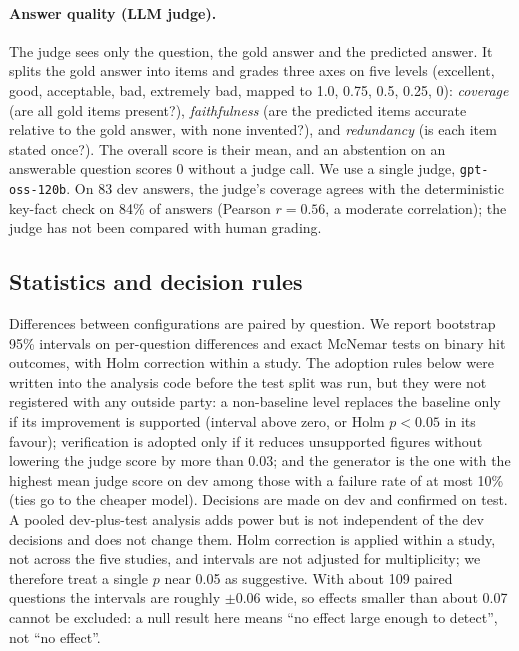 \documentclass[11pt,a4paper]{article}
\begin{document}
\paragraph{Answer quality (LLM judge).}\label{sec:judge} The judge sees only the question, the gold answer and the predicted answer. It splits the gold answer into items and grades three axes on five levels (excellent, good, acceptable, bad, extremely bad, mapped to 1.0, 0.75, 0.5, 0.25, 0): \emph{coverage} (are all gold items present?), \emph{faithfulness} (are the predicted items accurate relative to the gold answer, with none invented?), and \emph{redundancy} (is each item stated once?). The overall score is their mean, and an abstention on an answerable question scores 0 without a judge call. We use a single judge, \texttt{gpt-oss-120b}. On 83 dev answers, the judge's coverage agrees with the deterministic key-fact check on 84\% of answers (Pearson $r=0.56$, a moderate correlation); the judge has not been compared with human grading.

\subsection{Statistics and decision rules}
Differences between configurations are paired by question. We report bootstrap 95\% intervals on per-question differences and exact McNemar tests on binary hit outcomes, with Holm correction within a study. The adoption rules below were written into the analysis code before the test split was run, but they were not registered with any outside party: a non-baseline level replaces the baseline only if its improvement is supported (interval above zero, or Holm $p<0.05$ in its favour); verification is adopted only if it reduces unsupported figures without lowering the judge score by more than 0.03; and the generator is the one with the highest mean judge score on dev among those with a failure rate of at most 10\% (ties go to the cheaper model). Decisions are made on dev and confirmed on test. A pooled dev-plus-test analysis adds power but is not independent of the dev decisions and does not change them. Holm correction is applied within a study, not across the five studies, and intervals are not adjusted for multiplicity; we therefore treat a single $p$ near 0.05 as suggestive. With about 109 paired questions the intervals are roughly $\pm0.06$ wide, so effects smaller than about 0.07 cannot be excluded: a null result here means ``no effect large enough to detect'', not ``no effect''.
\end{document}
